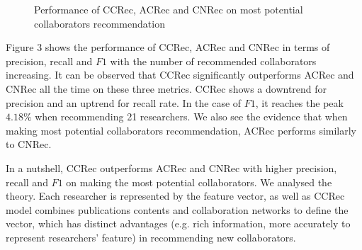 \documentclass[review]{elsarticle}
\begin{document}
\begin{figure}
\centering
{}
\caption{Performance of CCRec, ACRec and CNRec on most potential collaborators recommendation}
\label{fig:3}       %
\end{figure}

Figure 3 shows the performance of CCRec, ACRec and CNRec in terms of precision, recall and $F1$ with the number of recommended collaborators increasing. It can be observed that CCRec significantly outperforms ACRec and CNRec all the time on these three metrics. CCRec shows a downtrend for precision and an uptrend for recall rate. In the case of $F1$, it reaches the peak $4.18\%$ when recommending 21 researchers. We also see the evidence that when making most potential collaborators recommendation, ACRec performs similarly to CNRec.

In a nutshell, CCRec outperforms ACRec and CNRec with higher precision, recall and $F1$ on making the most potential collaborators. We analysed the theory. Each researcher is represented by the feature vector, as well as CCRec model combines publications contents and collaboration networks to define the vector, which has distinct advantages (e.g. rich information, more accurately to represent researchers' feature) in recommending new collaborators.
\end{document}

